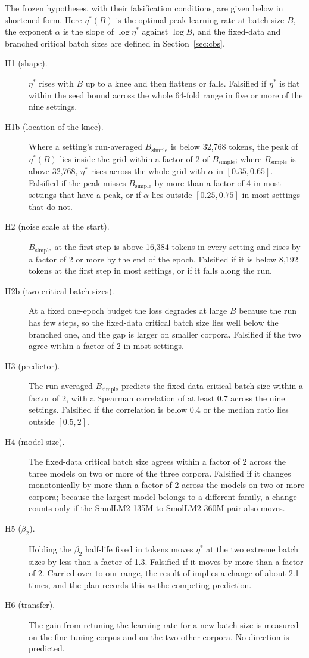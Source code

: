 \documentclass[10pt]{article}
\newcommand{\bsimple}{B_{\mathrm{simple}}}
\begin{document}
The frozen hypotheses, with their falsification conditions, are given below in shortened form. Here $\eta^*(B)$ is the optimal peak learning rate at batch size $B$, the exponent $\alpha$ is the slope of $\log \eta^*$ against $\log B$, and the fixed-data and branched critical batch sizes are defined in Section~\ref{sec:cbs}.
\begin{description}
\item[H1 (shape).] $\eta^*$ rises with $B$ up to a knee and then flattens or falls. Falsified if $\eta^*$ is flat within the seed bound across the whole 64-fold range in five or more of the nine settings.
\item[H1b (location of the knee).] Where a setting's run-averaged $\bsimple$ is below 32,768 tokens, the peak of $\eta^*(B)$ lies inside the grid within a factor of 2 of $\bsimple$; where $\bsimple$ is above 32,768, $\eta^*$ rises across the whole grid with $\alpha$ in $[0.35, 0.65]$. Falsified if the peak misses $\bsimple$ by more than a factor of 4 in most settings that have a peak, or if $\alpha$ lies outside $[0.25, 0.75]$ in most settings that do not.
\item[H2 (noise scale at the start).] $\bsimple$ at the first step is above 16,384 tokens in every setting and rises by a factor of 2 or more by the end of the epoch. Falsified if it is below 8,192 tokens at the first step in most settings, or if it falls along the run.
\item[H2b (two critical batch sizes).] At a fixed one-epoch budget the loss degrades at large $B$ because the run has few steps, so the fixed-data critical batch size lies well below the branched one, and the gap is larger on smaller corpora. Falsified if the two agree within a factor of 2 in most settings.
\item[H3 (predictor).] The run-averaged $\bsimple$ predicts the fixed-data critical batch size within a factor of 2, with a Spearman correlation of at least 0.7 across the nine settings. Falsified if the correlation is below 0.4 or the median ratio lies outside $[0.5, 2]$.
\item[H4 (model size).] The fixed-data critical batch size agrees within a factor of 2 across the three models on two or more of the three corpora. Falsified if it changes monotonically by more than a factor of 2 across the models on two or more corpora; because the largest model belongs to a different family, a change counts only if the SmolLM2-135M to SmolLM2-360M pair also moves.
\item[H5 ($\beta_2$).] Holding the $\beta_2$ half-life fixed in tokens moves $\eta^*$ at the two extreme batch sizes by less than a factor of 1.3. Falsified if it moves by more than a factor of 2. Carried over to our range, the result of \citet{marek2025} implies a change of about 2.1 times, and the plan records this as the competing prediction.
\item[H6 (transfer).] The gain from retuning the learning rate for a new batch size is measured on the fine-tuning corpus and on the two other corpora. No direction is predicted.
\end{description}
\end{document}
